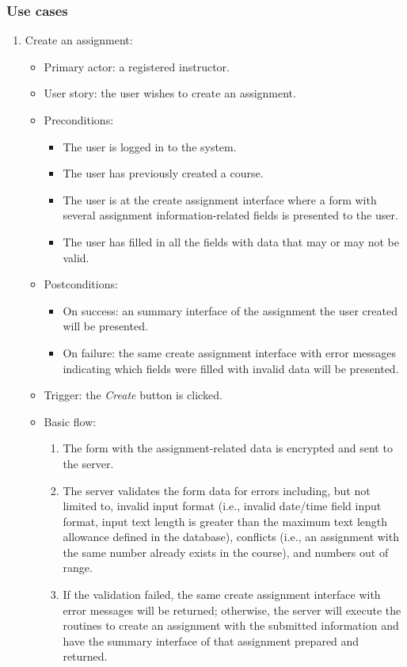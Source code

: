 \subsubsection{Use cases}
\begin{enumerate}
\item Create an assignment:
\begin{itemize}
    \item Primary actor: a registered instructor.
    \item User story: the user wishes to create an assignment.
    \item Preconditions:
        \begin{itemize}
            \item The user is logged in to the system.
            \item The user has previously created a course.
            \item The user is at the create assignment interface where a form
                with several assignment information-related fields is
                presented to the user.
            \item The user has filled in all the fields with data that may
                or may not be valid.
        \end{itemize}
    \item Postconditions:
        \begin{itemize}
            \item On success: an summary interface of the assignment the user
                created will be presented.
            \item On failure: the same create assignment interface with error
                messages indicating which fields were filled with invalid data
                will be presented.
        \end{itemize}
    \item Trigger: the \emph{Create} button is clicked.
    \item Basic flow:
        \begin{enumerate}
            \item The form with the assignment-related data is encrypted and
                sent to the server.
            \item The server validates the form data for errors including,
                but not limited to,
                invalid input format
                (i.e., invalid date/time field input format,
                input text length is greater than the maximum text length
                allowance defined in the database),
                conflicts (i.e., an assignment with the same
                number already exists in the course),
                and numbers out of range.
            \item If the validation failed, the same create assignment interface
                with error messages will be returned; otherwise, the server will
                execute the routines to create an assignment with the submitted
                information and have the summary interface of that assignment
                prepared and returned.
        \end{enumerate}
\end{itemize}


\end{enumerate}
